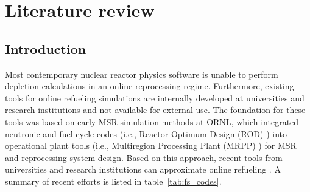 \chapter[Literature review]{Literature review}

\section{Introduction}
Most contemporary nuclear reactor physics software is 
unable to perform depletion calculations in an online 
reprocessing regime. Furthermore, existing tools for 
online refueling simulations are internally developed 
at universities and research institutions and not 
available for external use. The foundation for these 
tools was based on early \gls{MSR} simulation methods 
at \gls{ORNL}, which integrated neutronic and fuel 
cycle codes (i.e., Reactor Optimum Design (ROD) 
\cite{bauman_rod_1971}) into operational plant tools 
(i.e., Multiregion Processing Plant (MRPP) 
\cite{kee_mrpp_1976}) for \gls{MSR} and reprocessing 
system design. Based on this approach, recent tools 
from universities and research institutions can
approximate online refueling \cite{serp_molten_2014-1}. 
A summary of recent efforts is listed in table~\ref{tab:fs_codes}.
